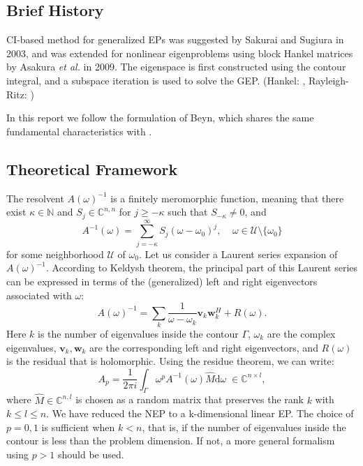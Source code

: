 \documentclass[final,leqno,onefignum,onetabnum]{siamltex1213}
\newcommand{\diff}{\mathrm{d}}
\begin{document}
\subsection{Brief History}
CI-based method for generalized EPs was suggested by Sakurai and Sugiura in 2003, \citep{sakurai2003projection} and was extended for nonlinear eigenproblems using block Hankel matrices by Asakura {\it et al.} in 2009. \citep{asakura_numerical_2009} The eigenspace is first constructed using the contour integral, and a subspace iteration is used to solve the GEP. (Hankel: \citep{asakura_numerical_2009}, Rayleigh-Ritz: \citep{yokota_projection_2013}) 

In this report we follow the formulation of Beyn\citep{beyn_integral_2012}, which shares the same fundamental characteristics with \citep{asakura_numerical_2009, sakurai_efficient_2013}. 
\subsection{Theoretical Framework}
The resolvent $A(\omega)^{-1}$ is a finitely meromorphic function, meaning that there exist $\kappa\in\mathbb{N}$ and $S_j\in \mathbb{C}^{n,n}$ for $j\geq -\kappa$ such that $S_{-\kappa}\neq 0$, and 
\begin{equation}\label{eq:Ainv}
A^{-1}(\omega)=\sum\limits_{j=-\kappa}^{\infty} S_j (\omega-\omega_0)^j,\;\;
\;\; \omega \in \mathcal{U} \setminus \lbrace\omega_0 \rbrace 
\end{equation}
for some neighborhood $\mathcal{U}$ of $\omega_0$. Let us consider a Laurent series expansion of $A(\omega)^{-1}$. According to Keldysh theorem, \citep{keldysh1951characteristic, beyn_integral_2012} the principal part of this Laurent series can be expressed in terms of the (generalized) left and right eigenvectors associated with $\omega$:
\begin{equation}
\label{eq:Keldysh}
A(\omega)^{-1} = \sum\limits_{k}\frac{1}{\omega-\omega_k}\mathbf{v}_k\mathbf{w}_k^H + R(\omega).
\end{equation}
Here $k$ is the number of eigenvalues inside the contour $\Gamma$, $\omega_k$ are the complex eigenvalues, $\mathbf{v}_k, \mathbf{w}_k$ are the corresponding left and right eigenvectors, and $R(\omega)$ is the residual that is holomorphic. Using the residue theorem, we can write: 
\begin{equation}\label{eq:cont}
A_{p} = \frac{1}{2\pi i}\int_{\Gamma}\omega^p A^{-1}(\omega)\hat{M} \diff\omega \;\in\mathbb{C}^{n \times l},
\end{equation}
where $\hat{M} \in \mathbb{C}^{n,l}$ is chosen as a random matrix that preserves the rank $k$ with $k \leq l \leq n$. We have reduced the NEP to a k-dimensional linear EP. The choice of $p=0,1$ is sufficient when $k<n$, that is, if the number of eigenvalues inside the contour is less than the problem dimension. If not, a more general formalism using $p > 1$ should be used. \citep{beyn_integral_2012}
\end{document}

